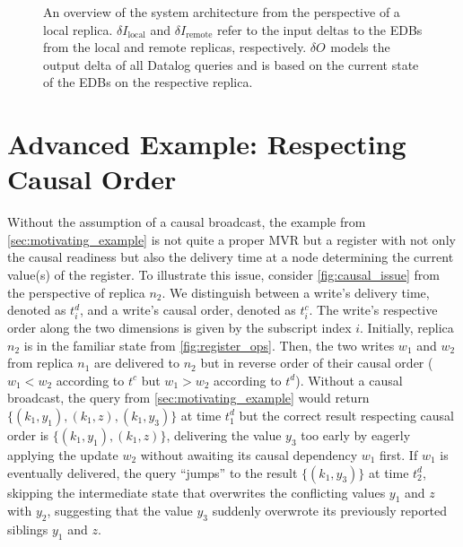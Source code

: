 \documentclass{article}
\newcommand{\deltaI}[1]{\(\delta I_{\text{#1}}\)}
\newcommand{\deltaO}[1][]{\(\delta O_{\text{#1}}\)}
\begin{document}
\begin{figure*}

	\caption{
		An overview of the system architecture from the perspective of a local
		replica.
		\deltaI{local} and \deltaI{remote} refer to the input deltas to
		the EDBs from the local and remote replicas, respectively.
		\deltaO{} models the output delta of all Datalog queries and is based on
		the current state of the EDBs on the respective replica.
	}\label{fig:system_overview}
\end{figure*}

\section{Advanced Example: Respecting Causal Order}

Without the assumption of a causal broadcast,
the example from \autoref{sec:motivating_example} is not quite a proper MVR
but a register with not only the causal readiness but also the delivery
time at a node determining the current value(s) of the register.
To illustrate this issue, consider \autoref{fig:causal_issue} from the
perspective of replica \(n_2\).
We distinguish between a write's delivery time, denoted as \(t^d_i\),
and a write's causal order, denoted as \(t^c_i\).
The write's respective order along the two dimensions is given by the subscript
index \(i\).
Initially, replica \(n_2\) is in the familiar state from \autoref{fig:register_ops}.
Then, the two writes \(w_1\) and \(w_2\) from replica \(n_1\) are delivered to \(n_2\)
but in reverse order of their causal order
(\(w_1 < w_2\) according to \(t^c\) but \(w_1 > w_2\) according to \(t^d\)).
Without a causal broadcast, the query from \autoref{sec:motivating_example}
would return \(\{ (k_1, y_1), (k_1, z), (k_1, y_3)\} \) at time \(t^d_1\)
but the correct result respecting causal order
is \(\{ (k_1, y_1), (k_1, z) \}\), delivering the value \(y_3\) too early by
eagerly applying the update \(w_2\) without awaiting its causal dependency
\(w_1\) first.
If \(w_1\) is eventually delivered, the query ``jumps'' to the result
\( \{ (k_1, y_3) \} \) at time \(t^d_2\), skipping the intermediate state
that overwrites the conflicting values \(y_1\) and \(z\) with \(y_2\),
suggesting that the value \(y_3\) suddenly overwrote its previously reported
siblings \(y_1\) and \(z\).
\end{document}
